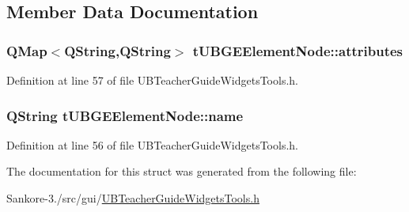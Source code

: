 \subsection{Member Data Documentation}
\hypertarget{structt_u_b_g_e_element_node_a09864b0527ab656ef8f468aed230aaa8}{
\subsubsection[{attributes}]{\setlength{\rightskip}{0pt plus 5cm}Q\-Map$<$Q\-String,Q\-String$>$ t\-U\-B\-G\-E\-Element\-Node\-::attributes}}\label{dc/d4a/structt_u_b_g_e_element_node_a09864b0527ab656ef8f468aed230aaa8}


Definition at line 57 of file U\-B\-Teacher\-Guide\-Widgets\-Tools.\-h.

\hypertarget{structt_u_b_g_e_element_node_a889b0141b125b4440cde206ba57d9c8a}{
\subsubsection[{name}]{\setlength{\rightskip}{0pt plus 5cm}Q\-String t\-U\-B\-G\-E\-Element\-Node\-::name}}\label{dc/d4a/structt_u_b_g_e_element_node_a889b0141b125b4440cde206ba57d9c8a}


Definition at line 56 of file U\-B\-Teacher\-Guide\-Widgets\-Tools.\-h.



The documentation for this struct was generated from the following file\-:\begin{DoxyCompactItemize}
\item 
Sankore-\/3./src/gui/\hyperlink{_u_b_teacher_guide_widgets_tools_8h}{U\-B\-Teacher\-Guide\-Widgets\-Tools.\-h}\end{DoxyCompactItemize}
